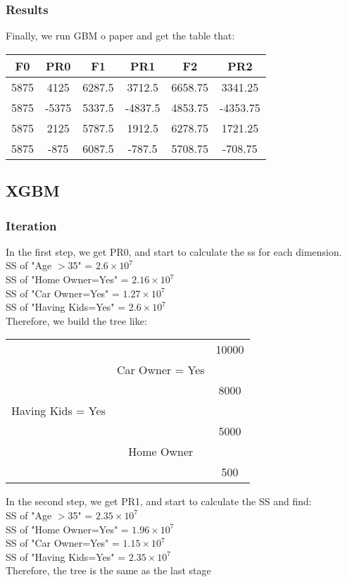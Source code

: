\documentclass[a4paper,12pt]{journal}
\begin{document}
	\subsubsection*{Results}
	Finally, we run GBM o paper and get the table that:
	\begin{center}
		\begin{tabular}{|c|c|c|c|c|c|}
			\hline
			F0&PR0&F1&PR1&F2&PR2\\\hline
			5875&4125&6287.5&3712.5&6658.75&3341.25\\\hline
			5875&-5375&5337.5&-4837.5&4853.75&-4353.75\\\hline
			5875&2125&5787.5&1912.5&6278.75&1721.25\\\hline
			5875&-875&6087.5&-787.5&5708.75&-708.75\\\hline
		\end{tabular}
	\end{center}
	\subsection*{XGBM}
	\subsubsection*{Iteration}
	In the first step, we get PR0, and start to calculate the ss for each dimension. \\
	SS of "Age $>$35" = $2.6\times 10^7$\\
	SS of "Home Owner=Yes" = $2.16\times 10^7$\\
	SS of "Car Owner=Yes" = $1.27\times 10^7$\\
	SS of "Having Kids=Yes" = $2.6\times 10^7$\\
	Therefore, we build the tree like:
	\begin{center}
		\begin{tabular}{c c c}
			&&10000\\
			&Car Owner = Yes&\\
			&&8000\\
			Having Kids = Yes&&\\
			&&5000\\
			&Home Owner&\\
			&&500\\
		\end{tabular}
	\end{center}
	In the second step, we get PR1, and start to calculate the SS and find:\\
	SS of "Age $>$35" = $2.35\times 10^7$\\
	SS of "Home Owner=Yes" = $1.96\times 10^7$\\
	SS of "Car Owner=Yes" = $1.15\times 10^7$\\
	SS of "Having Kids=Yes" = $2.35\times 10^7$\\
	Therefore, the tree is the same as the last stage\\
\end{document}
